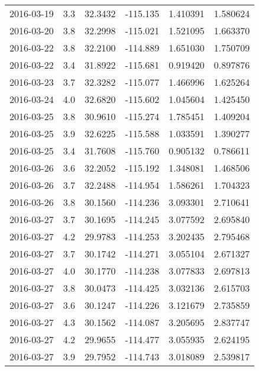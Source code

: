 \begin{tabular}{lrrrrr}
2016-03-19 &       3.3 &  32.3432 &  -115.135 &         1.410391 &         1.580624 \\
2016-03-20 &       3.8 &  32.2998 &  -115.021 &         1.521095 &         1.663370 \\
2016-03-22 &       3.8 &  32.2100 &  -114.889 &         1.651030 &         1.750709 \\
2016-03-22 &       3.4 &  31.8922 &  -115.681 &         0.919420 &         0.897876 \\
2016-03-23 &       3.7 &  32.3282 &  -115.077 &         1.466996 &         1.625264 \\
2016-03-24 &       4.0 &  32.6820 &  -115.602 &         1.045604 &         1.425450 \\
2016-03-25 &       3.8 &  30.9610 &  -115.274 &         1.785451 &         1.409204 \\
2016-03-25 &       3.9 &  32.6225 &  -115.588 &         1.033591 &         1.390277 \\
2016-03-25 &       3.4 &  31.7608 &  -115.760 &         0.905132 &         0.786611 \\
2016-03-26 &       3.6 &  32.2052 &  -115.192 &         1.348081 &         1.468506 \\
2016-03-26 &       3.7 &  32.2488 &  -114.954 &         1.586261 &         1.704323 \\
2016-03-26 &       3.8 &  30.1560 &  -114.236 &         3.093301 &         2.710641 \\
2016-03-27 &       3.7 &  30.1695 &  -114.245 &         3.077592 &         2.695840 \\
2016-03-27 &       4.2 &  29.9783 &  -114.253 &         3.202435 &         2.795468 \\
2016-03-27 &       3.7 &  30.1742 &  -114.271 &         3.055104 &         2.671327 \\
2016-03-27 &       4.0 &  30.1770 &  -114.238 &         3.077833 &         2.697813 \\
2016-03-27 &       3.8 &  30.0473 &  -114.425 &         3.032136 &         2.615703 \\
2016-03-27 &       3.6 &  30.1247 &  -114.226 &         3.121679 &         2.735859 \\
2016-03-27 &       4.3 &  30.1562 &  -114.087 &         3.205695 &         2.837747 \\
2016-03-27 &       4.2 &  29.9655 &  -114.477 &         3.055935 &         2.624195 \\
2016-03-27 &       3.9 &  29.7952 &  -114.743 &         3.018089 &         2.539817 \\

\end{tabular}
